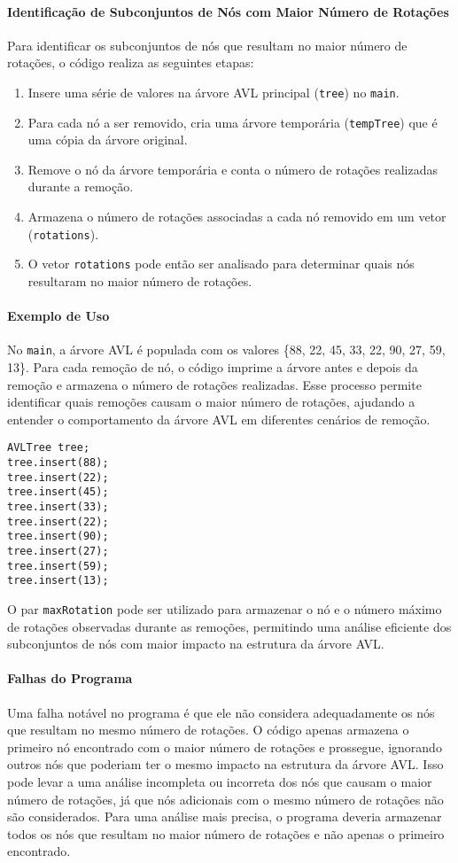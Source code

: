\documentclass{article}
\begin{document}
\paragraph{Identificação de Subconjuntos de Nós com Maior Número de Rotações}
Para identificar os subconjuntos de nós que resultam no maior número de rotações, o código realiza as seguintes etapas:

\begin{enumerate}
    \item Insere uma série de valores na árvore AVL principal (\texttt{tree}) no \texttt{main}.
    \item Para cada nó a ser removido, cria uma árvore temporária (\texttt{tempTree}) que é uma cópia da árvore original.
    \item Remove o nó da árvore temporária e conta o número de rotações realizadas durante a remoção.
    \item Armazena o número de rotações associadas a cada nó removido em um vetor (\texttt{rotations}).
    \item O vetor \texttt{rotations} pode então ser analisado para determinar quais nós resultaram no maior número de rotações.
\end{enumerate}

\paragraph{Exemplo de Uso}
No \texttt{main}, a árvore AVL é populada com os valores \{88, 22, 45, 33, 22, 90, 27, 59, 13\}. Para cada remoção de nó, o código imprime a árvore antes e depois da remoção e armazena o número de rotações realizadas. Esse processo permite identificar quais remoções causam o maior número de rotações, ajudando a entender o comportamento da árvore AVL em diferentes cenários de remoção.

\begin{verbatim}
AVLTree tree;
tree.insert(88);
tree.insert(22);
tree.insert(45);
tree.insert(33);
tree.insert(22);
tree.insert(90);
tree.insert(27);
tree.insert(59);
tree.insert(13);
\end{verbatim}

O par \texttt{maxRotation} pode ser utilizado para armazenar o nó e o número máximo de rotações observadas durante as remoções, permitindo uma análise eficiente dos subconjuntos de nós com maior impacto na estrutura da árvore AVL.

\paragraph{Falhas do Programa}
Uma falha notável no programa é que ele não considera adequadamente os nós que resultam no mesmo número de rotações. O código apenas armazena o primeiro nó encontrado com o maior número de rotações e prossegue, ignorando outros nós que poderiam ter o mesmo impacto na estrutura da árvore AVL. Isso pode levar a uma análise incompleta ou incorreta dos nós que causam o maior número de rotações, já que nós adicionais com o mesmo número de rotações não são considerados. Para uma análise mais precisa, o programa deveria armazenar todos os nós que resultam no maior número de rotações e não apenas o primeiro encontrado.
\end{document}
